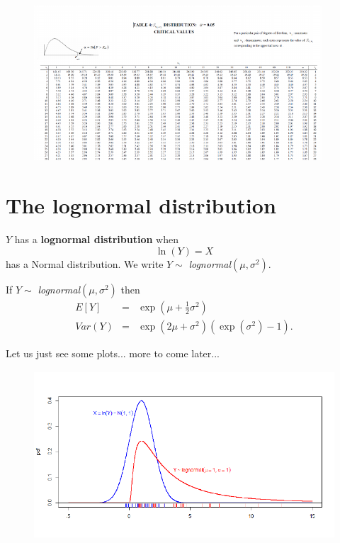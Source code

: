 \documentclass[smaller]{beamer}\usepackage[]{graphicx}\usepackage[]{color}
\begin{document}
\begin{frame}
  \begin{figure}[ptb]\centering
  \includegraphics[height=2.2753in, width=4.2263in]{img/Fdist_table__7.pdf}%
  \end{figure}
\end{frame}%

\section{The lognormal distribution}

\begin{frame}{\secname}
  \begin{definition}
   $Y$ has a \textbf{lognormal distribution} when
   $$\ln \left( Y\right) =X$$
  has a Normal distribution. We write $Y\sim $ \emph{lognormal}$\left( \mu ,\sigma ^{2}\right) $.
  \end{definition}

  \medskip

  If $Y\sim $ \emph{lognormal}$\left( \mu ,\sigma ^{2}\right) $ then%
  \begin{eqnarray*}
  E\left[ Y\right] &=&\exp{ \left( \mu +\frac{1}{2}\sigma ^{2}\right)} \\
  Var(Y) &=&\exp{ \left( 2\mu +\sigma ^{2}\right)} \left( \exp{ \left( \sigma
  ^{2}\right)} -1\right).
  \end{eqnarray*}
\end{frame}

\begin{frame}{\secname}
  Let us just see some plots... more to come later...
  \begin{figure}[ptb]\centering
  \includegraphics[height=2.4856in, width=4.5in]{img/lognormal_with_rug__8.pdf}%
  \end{figure}
\end{frame}
\end{document}
